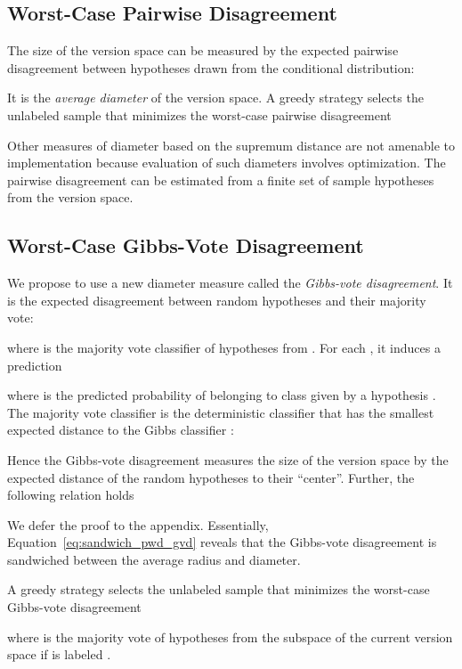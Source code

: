 \documentclass[runningheads, envcountsame, a4paper]{llncs}
\begin{document}
\subsection{Worst-Case Pairwise Disagreement}
\label{sec:worst_case_pairwise_disagreement}
The size of the version space can be measured by the expected pairwise disagreement between hypotheses drawn from the conditional distribution:

It is the \textit{average diameter} of the version space.
A greedy strategy selects the unlabeled sample that minimizes the worst-case pairwise disagreement

Other measures of diameter based on the supremum distance \cite{Kaariainen05,Dasgupta06} are not amenable to implementation because evaluation of such diameters involves optimization. The pairwise disagreement can be estimated from a finite set of sample hypotheses from the version space.



\subsection{Worst-Case Gibbs-Vote Disagreement}
\label{sec:worst_case_gibbs_vote_disagreement}
We propose to use a new diameter measure called the \textit{Gibbs-vote disagreement}. It is the expected disagreement between random hypotheses and their majority vote:

where  is the majority vote classifier of hypotheses from . For each , it induces a prediction

where  is the predicted probability of  belonging to class  given by a hypothesis .
The majority vote classifier is the deterministic classifier that has the smallest expected distance to the Gibbs classifier \cite{Kaariainen05,Devroye13}:

Hence the Gibbs-vote disagreement measures the size of the version space by the expected distance of the random hypotheses to their ``center''. Further, the following relation holds

We defer the proof to the appendix. Essentially, Equation~\eqref{eq:sandwich_pwd_gvd} reveals that the Gibbs-vote disagreement is sandwiched between the average radius and diameter.

A greedy strategy selects the unlabeled sample that minimizes the worst-case Gibbs-vote disagreement

where  is the majority vote of hypotheses from the subspace  of the current version space if  is labeled .
\end{document}
